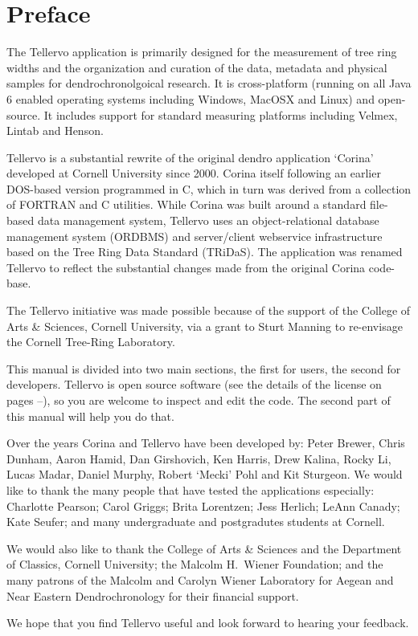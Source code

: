\section*{Preface}
\thispagestyle{empty} 

The Tellervo application is primarily designed for the measurement of tree ring widths and the organization and curation of the data, metadata and physical samples for dendrochronolgoical research. It is cross-platform (running on all Java 6 enabled operating systems including Windows, MacOSX and Linux) and open-source. It includes support for standard measuring platforms including Velmex, Lintab and Henson.

Tellervo is a substantial rewrite of the original dendro application `Corina' developed at Cornell University since 2000.  Corina itself following an earlier DOS-based version programmed in C, which in turn was derived from a collection of FORTRAN and C utilities.  While Corina was built around a standard file-based data management system, Tellervo uses an object-relational database management system (ORDBMS) and server/client webservice infrastructure based on the Tree Ring Data Standard (TRiDaS).  The application was renamed Tellervo to reflect the substantial changes made from the original Corina code-base.

The Tellervo initiative was made possible because of the support of the College of Arts \& Sciences, Cornell University, via a grant to Sturt Manning to re-envisage the Cornell Tree-Ring Laboratory.

This manual is divided into two main sections, the first for users, the second for developers.  Tellervo is open source software (see the details of the license on pages \pageref{txt:licenseStart}--\pageref{txt:licenseEnd}), so you are welcome to inspect and edit the code.  The second part of this manual will help you do that.

Over the years Corina and Tellervo have been developed by: Peter Brewer, Chris Dunham, Aaron Hamid, Dan Girshovich, Ken Harris, Drew Kalina, Rocky Li, Lucas Madar, Daniel Murphy, Robert `Mecki' Pohl and Kit Sturgeon.  We would like to thank the many people that have tested the applications especially: Charlotte Pearson; Carol Griggs; Brita Lorentzen; Jess Herlich; LeAnn Canady; Kate Seufer; and many undergraduate and postgradutes students at Cornell.  

We would also like to thank the College of Arts \& Sciences and the Department of Classics, Cornell University; the Malcolm H.\ Wiener Foundation; and the many patrons of the Malcolm and Carolyn Wiener Laboratory for Aegean and Near Eastern Dendrochronology for their financial support.  

We hope that you find Tellervo useful and look forward to hearing your feedback.  



